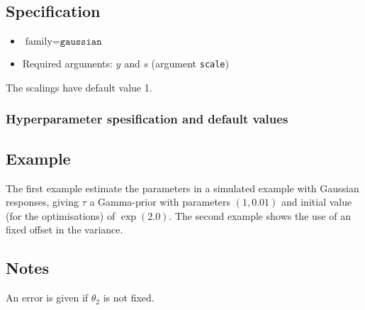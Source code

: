 \documentclass[a4paper,11pt]{article}
\begin{document}
\subsection*{Specification}

\begin{itemize}
\item $\text{family}=\texttt{gaussian}$
\item Required arguments: $y$ and $s$ (argument \texttt{scale})
\end{itemize}
The scalings have default value 1.

\subsubsection*{Hyperparameter spesification and default values}


\subsection*{Example}

The first example estimate the parameters in a simulated example with
Gaussian responses, giving $\tau$ a Gamma-prior with parameters
$(1, 0.01)$ and initial value (for the optimisations) of $\exp(2.0)$.
The second example shows the use of an fixed offset in the variance.


\subsection*{Notes}

An error is given if $\theta_2$ is not fixed. 
\end{document}
